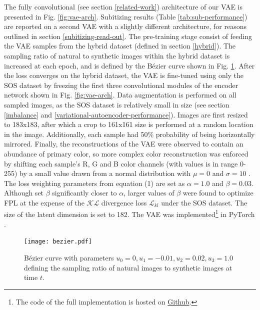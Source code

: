 \documentclass[twocolumn]{article}
\begin{document}
\noindent The fully convolutional (see section \ref{related-work}) architecture of our VAE is presented in Fig. \ref{fig:vae-arch}. Subitizing results (Table \ref{tab:sub-performance}) are reported on a second VAE with a slightly different architecture, for reasons outlined in section \ref{subitizing-read-out}.
The pre-training stage consist of feeding the VAE samples from the hybrid dataset (defined in section \ref{hybrid}). The sampling ratio of natural to synthetic images within the hybrid dataset is increased at each epoch, and is defined by the Bézier curve shown in Fig. \ref{fig:bezier}. After the loss converges on the hybrid dataset, the VAE is fine-tuned using only the SOS dataset by freezing the first three convolutional modules of the encoder network shown in Fig. \ref{fig:vae-arch}.  Data augmentation is performed on all sampled images, as the SOS dataset is relatively small in size (see section \ref{imbalance} and \ref{variational-autoencoder-performance}).  Images are first resized to 183x183, after which a crop to 161x161 size is performed at a random location in the image. Additionally, each sample had 50\% probability of being horizontally mirrored. Finally, the reconstructions of the VAE were observed to contain an abundance of primary color, so more complex color reconstruction was enforced by shifting each sample's R, G and B color channels (with values is in range 0-255) by a small value drawn from a normal distribution with \(\mu=0\) and \(\sigma=10\) \citep[the G channel uses \(\sigma=3.5\) because heavy green shifts produced unrealistic samples, possibly because green lighting contributes most to human color intensity perception][]{anderson1996proposal}. The loss weighting parameters from equation (1) are set as \(\alpha=1.0\) and \(\beta=0.03\). Although \citet{hou2017deep} set \(\beta\) significantly closer to \(\alpha\), larger values of \(\beta\) were found to optimize FPL at the expense of the \(\mathcal{KL}\) divergence loss \(\mathcal{L}_{kl}\) under the SOS dataset. The size of the latent dimension is set to 182. The VAE was implemented\footnote{The code of the full implementation is hosted on \href{https://github.com/rien333/numbersense-vae}{Github}.} in PyTorch \citep{paszke2017automatic}. 

\begin{figure}
\centering
\texttt{[image: bezier.pdf]}
\caption{Bézier curve with parameters
\(u_0=0, u_1=-0.01, u_2=0.02, u_3=1.0\) defining the sampling ratio of natural images to synthetic images at time \(t\). }
\label{fig:bezier}
\end{figure}
\end{document}
